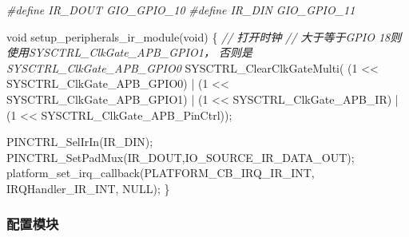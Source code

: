\documentclass[
  12pt,
]{book}
\newenvironment{Shaded}{\begin{snugshade}}{\end{snugshade}}
\newcommand{\CommentTok}[1]{\textcolor[rgb]{0.56,0.35,0.01}{\textit{#1}}}
\newcommand{\DataTypeTok}[1]{\textcolor[rgb]{0.13,0.29,0.53}{#1}}
\newcommand{\DecValTok}[1]{\textcolor[rgb]{0.00,0.00,0.81}{#1}}
\newcommand{\NormalTok}[1]{#1}
\newcommand{\PreprocessorTok}[1]{\textcolor[rgb]{0.56,0.35,0.01}{\textit{#1}}}
\begin{document}
\begin{Shaded}
\begin{Highlighting}[]
\PreprocessorTok{#define IR_DOUT GIO_GPIO_10}
\PreprocessorTok{#define IR_DIN  GIO_GPIO_11}

\DataTypeTok{void}\NormalTok{ setup_peripherals_ir_module(}\DataTypeTok{void}\NormalTok{)}
\NormalTok{\{}
    \CommentTok{// 打开时钟}
    \CommentTok{// 大于等于GPIO 18则使用SYSCTRL_ClkGate_APB_GPIO1， 否则是SYSCTRL_ClkGate_APB_GPIO0}
\NormalTok{    SYSCTRL_ClearClkGateMulti(   (}\DecValTok{1}\NormalTok{ << SYSCTRL_ClkGate_APB_GPIO0)}
\NormalTok{                                | (}\DecValTok{1}\NormalTok{ << SYSCTRL_ClkGate_APB_GPIO1)}
\NormalTok{                                | (}\DecValTok{1}\NormalTok{ << SYSCTRL_ClkGate_APB_IR)}
\NormalTok{                                | (}\DecValTok{1}\NormalTok{ << SYSCTRL_ClkGate_APB_PinCtrl));}
                                
\NormalTok{    PINCTRL_SelIrIn(IR_DIN);}
\NormalTok{    PINCTRL_SetPadMux(IR_DOUT,IO_SOURCE_IR_DATA_OUT);}
\NormalTok{    platform_set_irq_callback(PLATFORM_CB_IRQ_IR_INT, IRQHandler_IR_INT, NULL);}
\NormalTok{\}}
\end{Highlighting}
\end{Shaded}

\hypertarget{ux914dux7f6eux6a21ux5757}{%
\subsubsection{配置模块}\label{ux914dux7f6eux6a21ux5757}}
\end{document}
